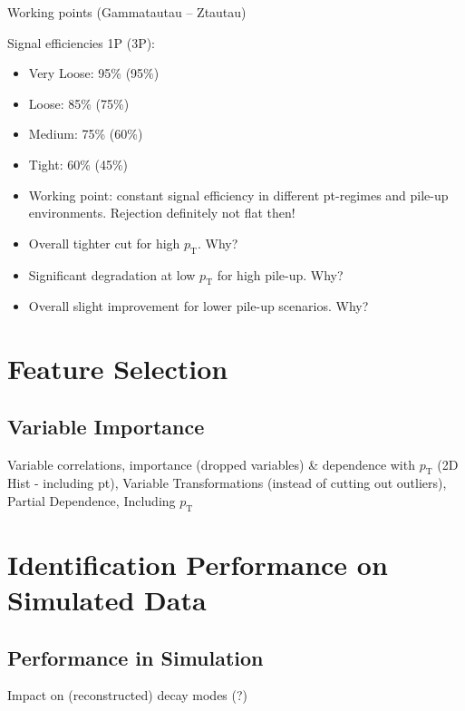 Working points (Gammatautau -- Ztautau)

Signal efficiencies 1P (3P):
\begin{itemize}
\item Very Loose: 95\% (95\%)
\item Loose: 85\% (75\%)
\item Medium: 75\% (60\%)
\item Tight: 60\% (45\%)
\end{itemize}

\begin{itemize}
\item Working point: constant signal efficiency in different pt-regimes and
  pile-up environments. Rejection definitely not flat then!
\item Overall tighter cut for high $p_\text{T}$. Why?
\item Significant degradation at low $p_\text{T}$ for high pile-up. Why?
\item Overall slight improvement for lower pile-up scenarios. Why?
\end{itemize}

\section{Feature Selection}
\label{sec:bdt_feature_selection}

\subsection{Variable Importance}
\label{sec:bdt_var_importance}


Variable correlations, importance (dropped variables) \& dependence with
$p_\mathrm{T}$ (2D Hist - including pt), Variable Transformations (instead
of cutting out outliers), Partial Dependence, Including $p_\mathrm{T}$

\section{Identification Performance on Simulated Data}
\label{sec:bdt_perf}

\subsection{Performance in Simulation}
\label{sec:bdt_perf_sim}

Impact on (reconstructed) decay modes (?)

